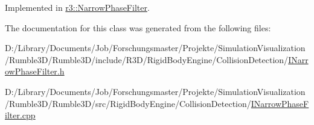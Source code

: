 Implemented in \mbox{\hyperlink{classr3_1_1_narrow_phase_filter_a44da84d1dbc12e9f95af46aac270ebb8}{r3\+::\+Narrow\+Phase\+Filter}}.



The documentation for this class was generated from the following files\+:\begin{DoxyCompactItemize}
\item 
D\+:/\+Library/\+Documents/\+Job/\+Forschungsmaster/\+Projekte/\+Simulation\+Visualization/\+Rumble3\+D/\+Rumble3\+D/include/\+R3\+D/\+Rigid\+Body\+Engine/\+Collision\+Detection/\mbox{\hyperlink{_i_narrow_phase_filter_8h}{I\+Narrow\+Phase\+Filter.\+h}}\item 
D\+:/\+Library/\+Documents/\+Job/\+Forschungsmaster/\+Projekte/\+Simulation\+Visualization/\+Rumble3\+D/\+Rumble3\+D/src/\+Rigid\+Body\+Engine/\+Collision\+Detection/\mbox{\hyperlink{_i_narrow_phase_filter_8cpp}{I\+Narrow\+Phase\+Filter.\+cpp}}\end{DoxyCompactItemize}
